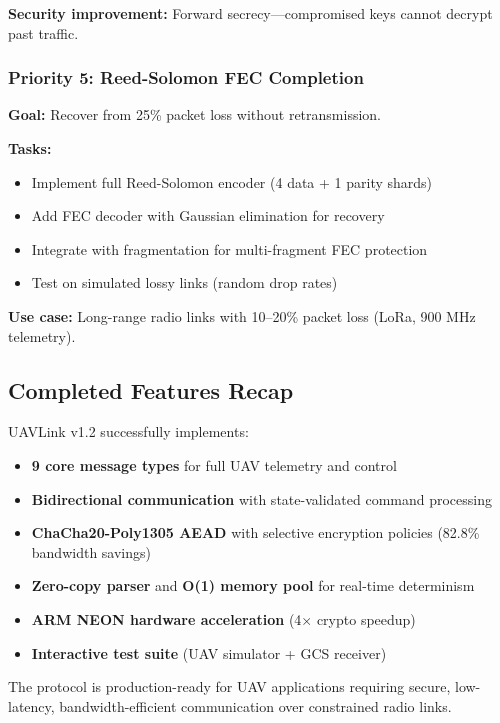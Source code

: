 \documentclass[11pt,a4paper]{article}
\begin{document}
\textbf{Security improvement:} Forward secrecy---compromised keys cannot decrypt past traffic.

\subsubsection{Priority 5: Reed-Solomon FEC Completion}
\textbf{Goal:} Recover from 25\% packet loss without retransmission.

\textbf{Tasks:}
\begin{itemize}[noitemsep]
    \item Implement full Reed-Solomon encoder (4 data + 1 parity shards)
    \item Add FEC decoder with Gaussian elimination for recovery
    \item Integrate with fragmentation for multi-fragment FEC protection
    \item Test on simulated lossy links (random drop rates)
\end{itemize}

\textbf{Use case:} Long-range radio links with 10--20\% packet loss (LoRa, 900 MHz telemetry).

\subsection{Completed Features Recap}

UAVLink v1.2 successfully implements:
\begin{itemize}[noitemsep]
    \item \textbf{9 core message types} for full UAV telemetry and control
    \item \textbf{Bidirectional communication} with state-validated command processing
    \item \textbf{ChaCha20-Poly1305 AEAD} with selective encryption policies (82.8\% bandwidth savings)
    \item \textbf{Zero-copy parser} and \textbf{O(1) memory pool} for real-time determinism
    \item \textbf{ARM NEON hardware acceleration} (4$\times$ crypto speedup)
    \item \textbf{Interactive test suite} (UAV simulator + GCS receiver)
\end{itemize}

The protocol is production-ready for UAV applications requiring secure, low-latency, bandwidth-efficient communication over constrained radio links.

\end{document}
